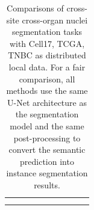 \documentclass[letterpaper]{article} %
\begin{document}
\begin{table}
{\begin{tabular}{c|ccccc|cccc}
&\cellcolor{gray1}{TCGA}  &\cellcolor{gray1}{76.59} &\cellcolor{gray1}{72.67} &\cellcolor{gray1}{53.04} &\cellcolor{gray1}{12.69} & & &  \\
&\cellcolor{gray2}{TNBC}  &\cellcolor{gray2}{75.01} &\cellcolor{gray2}{74.03} &\cellcolor{gray2}{50.76} &\cellcolor{gray2}{29.54} & & &  \\
\bottomrule
\end{tabular}}
\caption{Comparisons of cross-site cross-organ nuclei segmentation tasks with Cell17, TCGA, TNBC as distributed local data. For a fair comparison, all methods use the same U-Net architecture as the segmentation model and the same post-processing to convert the semantic prediction into instance segmentation results.
}
\label{tab:nucleicrosssite}
\end{table}








\end{document}
